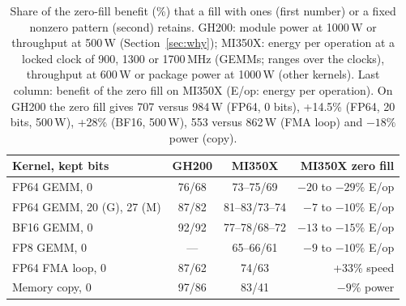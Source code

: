 \documentclass[conference]{IEEEtran}
\newcommand{\W}{\,W}
\newcommand{\pct}{\%}
\begin{document}
\begin{table}[t]
\caption{Share of the zero-fill benefit (\%) that a fill with ones (first number) or a fixed nonzero pattern (second)
retains. GH200: module power at 1000\W{} or throughput at 500\W{} (Section~\ref{sec:why}); MI350X: energy per
operation at a locked clock of 900, 1300 or 1700\,MHz (GEMMs; ranges over the clocks), throughput at 600\W{} or package
power at 1000\W{} (other kernels). Last column: benefit of the zero fill on MI350X (E/op: energy per operation). On
GH200 the zero fill gives 707 versus 984\W{} (FP64, 0 bits), +14.5\pct{} (FP64, 20 bits, 500\W), +28\pct{} (BF16,
500\W), 553 versus 862\W{} (FMA loop) and $-18\pct$ power (copy).}\label{tab:fill2}
\centering\footnotesize\setlength{\tabcolsep}{2.5pt}
\begin{tabular}{@{}lccr@{}}
\toprule
Kernel, kept bits & GH200 & MI350X & MI350X zero fill \\
\midrule
FP64 GEMM, 0 & 76/68 & 73--75/69 & $-20$ to $-29\pct$ E/op \\
FP64 GEMM, 20 (G), 27 (M) & 87/82 & 81--83/73--74 & $-7$ to $-10\pct$ E/op \\
BF16 GEMM, 0 & 92/92 & 77--78/68--72 & $-13$ to $-15\pct$ E/op \\
FP8 GEMM, 0 & --- & 65--66/61 & $-9$ to $-10\pct$ E/op \\
FP64 FMA loop, 0 & 87/62 & 74/63 & +33\pct{} speed \\
Memory copy, 0 & 97/86 & 83/41 & $-9\pct$ power \\
\bottomrule
\end{tabular}
\end{table}
\end{document}
